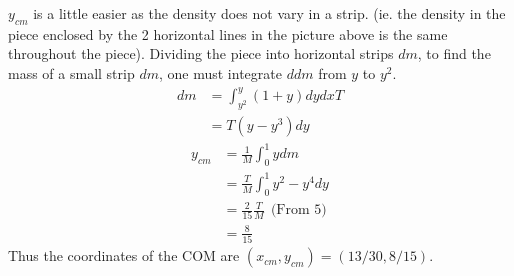 \documentclass{article}
\begin{document}
\begin{enumerate}[label=\alph*)]
    $y_{cm}$ is a little easier as the density does not vary in a strip. (ie. the density in the piece enclosed by the 2 horizontal lines in the picture above is the same throughout the piece). Dividing the piece into horizontal strips $dm$, to find the mass of a small strip $dm$, one must integrate $ddm$ from $y$ to $y^2$.
    \begin{align*}
        dm &= \int^{y}_{y^2} (1+y) dy dx T\\
        &= T (y -y^3) dy
    \end{align*}
    \begin{align*}
        y_{cm} &= \frac{1}{M}\int^1_0 y dm \\
        &=\frac{T}{M} \int^1_0 y^2-y^4 dy \\
        &= \frac{2}{15} \frac{T}{M} \ \ \text{(From 5)}\\
        &= \frac{8}{15}
    \end{align*}
    Thus the coordinates of the COM are $(x_{cm}, y_{cm})= (13/30, 8/15)$.
\end{enumerate}
\end{document}
